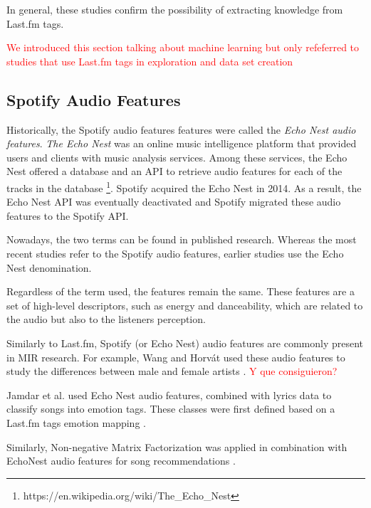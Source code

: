 \documentclass[sn-mathphys]{sn-jnl}%
\theoremstyle{thmstyleone}%
\theoremstyle{thmstyletwo}%
\theoremstyle{thmstylethree}%
\begin{document}

In general, these studies confirm the possibility of extracting knowledge from Last.fm tags.

\textcolor{red}{We introduced this section talking about machine learning but only refeferred to studies
that use Last.fm tags in exploration and data set creation}

\subsection{Spotify Audio Features}

Historically, the Spotify audio features features were called the \emph{Echo Nest audio features}.
\emph{The Echo Nest} was an online music intelligence platform that provided users and clients with music analysis services.
Among these services, the Echo Nest offered a database and an API to retrieve audio features for each of the tracks in the database \footnote[3]{https://en.wikipedia.org/wiki/The\_Echo\_Nest}.
Spotify acquired the Echo Nest in 2014.
As a result, the Echo Nest API was eventually deactivated and Spotify migrated these audio features to the Spotify API.

Nowadays, the two terms can be found in published research.
Whereas the most recent studies refer to the Spotify audio features,
earlier studies use the Echo Nest denomination.

Regardless of the term used, the features remain the same.
These features are a set of high-level descriptors, such as energy and danceability,
which are related to the audio but also to the listeners perception.

Similarly to Last.fm, Spotify (or Echo Nest) audio features are commonly present in MIR research.
For example, Wang and Horv{\'a}t used  these audio features to study the differences 
between male and female artists \cite{wang2019gender}.
\textcolor{red}{Y que consiguieron?}

Jamdar et al. used Echo Nest audio features, combined with lyrics data to classify songs into emotion tags.
These classes were first defined based on a Last.fm tags emotion mapping \cite{jamdar2015emotion}.

Similarly, Non-negative Matrix Factorization was applied in combination with EchoNest audio features
for song recommendations \cite{benzi2016song}.
\end{document}
